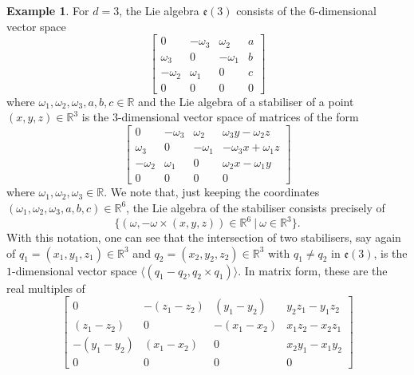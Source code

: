 \documentclass{article}
\theoremstyle{definition}
\newtheorem{example}[theorem]{Example}
\theoremstyle{remark}
\begin{document}
\begin{example}
    For $d=3$, the Lie algebra $\mathfrak{e}(3)$ consists of the $6$-dimensional vector space
    \begin{equation*}
    \begin{bmatrix}
     0 & -\omega_3 &\omega_2& a \\
    \omega_3 & 0  & -\omega_1& b\\
    -\omega_2 & \omega_1  & 0  & c\\
    0 & 0 & 0 & 0
    \end{bmatrix}
    \end{equation*}
    where $\omega_1, \omega_2, \omega_3, a,b,c\in \mathbb{R}$ and the Lie algebra of a stabiliser of a point $(x, y, z) \in \mathbb{R}^{3}$ is the $3$-dimensional vector space of matrices of the form
    \begin{equation*}
    \begin{bmatrix}
     0 & -\omega_3 &\omega_2& \omega_3 y -\omega_2 z\\
    \omega_3 & 0  & -\omega_1& - \omega_3 x +\omega_1 z\\
    -\omega_2 & \omega_1  & 0  & \omega_2 x - \omega_1 y\\
    0 & 0 & 0 & 0
    \end{bmatrix} 
     \end{equation*}
    where $\omega_1, \omega_2, \omega_3 \in \mathbb{R}.$ We note that, just keeping the coordinates $(\omega_1, \omega_2, \omega_3, a,b,c) \in \mathbb{R} ^{6}$, the Lie algebra of the stabiliser consists precisely of $$\{(\omega , -\omega \times (x,y,z)) \in \mathbb{R}^{6}~\vert~ \omega \in \mathbb{R}^{3}\}.$$
    With this notation, one can see that the intersection of two stabilisers, say again of $q_1=(x_1,y_1, z_1)\in \mathbb{R}^{3}$ and $q_2=(x_2, y_2, z_2) \in \mathbb{R}^{3}$ with $q_1\neq q_2$ in $\mathfrak{e}(3)$, is the $1$-dimensional vector space $\langle (q_1 - q_2, q_2 \times q_1 )\rangle$. In matrix form, these are the real multiples of
        \begin{equation*}
    \begin{bmatrix}
     0 & -(z_1 - z_2) &(y_1- y_2)& y_2 z_1 - y_1 z_2 \\
    (z_1 - z_2)  & 0  & -(x_1 - x_2)& x_1 z_2 - x_2 z_1 \\
    -(y_1- y_2) & (x_1 - x_2)  & 0  &  x_2 y_1- x_1 y_2\\
    0 & 0 & 0 & 0
    \end{bmatrix} 
     \end{equation*}

\end{example}
\end{document}
